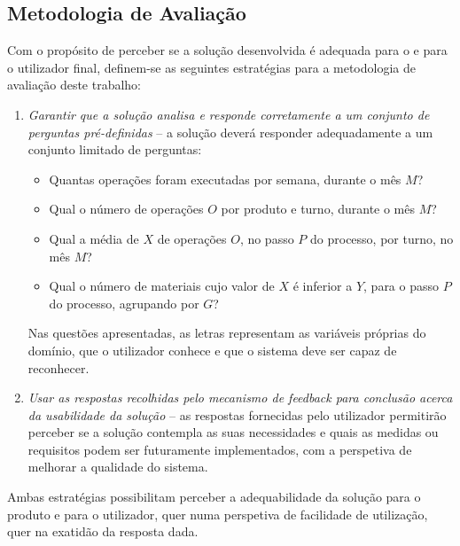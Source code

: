 \subsection{Metodologia de Avaliação}
Com o propósito de perceber se a solução desenvolvida é adequada para o {\productname} e para o utilizador final, definem-se as seguintes estratégias para a metodologia de avaliação deste trabalho:

\begin{enumerate}
\label{enum:pre1_qualitystrategies}
    \item 
    {
        \textit{Garantir que a solução analisa e responde corretamente a um conjunto de perguntas pré-definidas} -- a solução deverá responder adequadamente a um conjunto limitado de perguntas:
        \begin{itemize}
            \item 
            {
                Quantas operações foram executadas por semana, durante o mês $M$?
            }
            \item
            {
                Qual o número de operações $O$ por produto e turno, durante o mês $M$?
            }
            \item
            {
                Qual a média de $X$ de operações $O$, no passo $P$ do processo, por turno, no mês $M$? 
            }
            \item
            {
                Qual o número de materiais cujo valor de $X$ é inferior a $Y$, para o passo $P$ do processo, agrupando por $G$?
            }
        \end{itemize}
        
        Nas questões apresentadas, as letras representam as variáveis próprias do domínio, que o utilizador conhece e que o sistema deve ser capaz de reconhecer.
    }
    \item
    {
        \textit{Usar as respostas recolhidas pelo mecanismo de feedback para conclusão acerca da usabilidade da solução} -- as respostas fornecidas pelo utilizador permitirão perceber se a solução contempla as suas necessidades e quais as medidas ou requisitos podem ser futuramente implementados, com a perspetiva de melhorar a qualidade do sistema.
    }
\end{enumerate}

Ambas estratégias possibilitam perceber a adequabilidade da solução para o produto e para o utilizador, quer numa perspetiva de facilidade de utilização, quer na exatidão da resposta dada.

